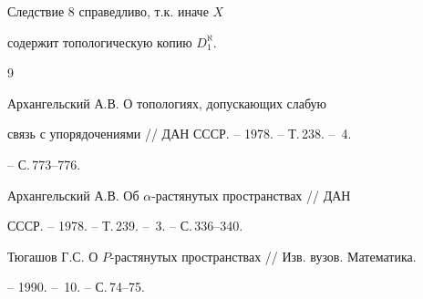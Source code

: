  


Следствие 8 справедливо, т.к. иначе $X$ 


содержит топологическую копию $D^\aleph_1$. 


 


\begin{thebibliography}{9} 


 




Архангельский А.В. О топологиях, допускающих слабую  


связь с упорядочениями // ДАН СССР. -- 1978. -- Т.\,238. -- \No\,4. 


-- С.\,773--776. 




Архангельский А.В. Об $\alpha$-растянутых пространствах // ДАН  


СССР. -- 1978. -- Т.\,239. -- \No\,3. -- С.\,336--340. 




Тюгашов Г.С. О $P$-растянутых пространствах // Изв. вузов. Математика. 


-- 1990. -- \No\,10. -- С.\,74--75. 


 


\end{thebibliography} 


 


\vskip 2cm 


 






 


\label{end} 


 


